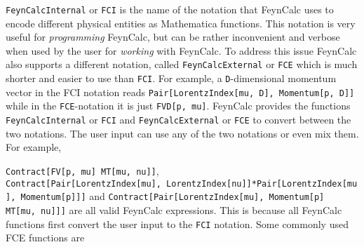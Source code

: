 \documentclass[../FeynCalcManual.tex]{subfiles}
\begin{document}
\texttt{FeynCalcInternal} or \texttt{FCI} is the name of the notation
that FeynCalc uses to encode different physical entities as Mathematica
functions. This notation is very useful for \emph{programming} FeynCalc,
but can be rather inconvenient and verbose when used by the user for
\emph{working} with FeynCalc. To address this issue FeynCalc also
supports a different notation, called \texttt{FeynCalcExternal} or
\texttt{FCE} which is much shorter and easier to use than \texttt{FCI}.
For example, a \texttt{D}-dimensional momentum vector in the FCI
notation reads
\texttt{Pair[\allowbreak{}LorentzIndex[\allowbreak{}mu,\ \allowbreak{}D],\ \allowbreak{}Momentum[\allowbreak{}p,\ \allowbreak{}D]]}
while in the \texttt{FCE}-notation it is just
\texttt{FVD[\allowbreak{}p,\ \allowbreak{}mu]}. FeynCalc provides the
functions \texttt{FeynCalcInternal} or \texttt{FCI} and
\texttt{FeynCalcExternal} or \texttt{FCE} to convert between the two
notations. The user input can use any of the two notations or even mix
them. For example,

\texttt{Contract[\allowbreak{}FV[\allowbreak{}p,\ \allowbreak{}mu] MT[\allowbreak{}mu,\ \allowbreak{}nu]]},
\texttt{Contract[\allowbreak{}Pair[\allowbreak{}LorentzIndex[\allowbreak{}mu],\ \allowbreak{}LorentzIndex[\allowbreak{}nu]]*Pair[\allowbreak{}LorentzIndex[\allowbreak{}mu],\ \allowbreak{}Momentum[\allowbreak{}p]]]}
and
\texttt{Contract[\allowbreak{}Pair[\allowbreak{}LorentzIndex[\allowbreak{}mu],\ \allowbreak{}Momentum[\allowbreak{}p] MT[\allowbreak{}mu,\ \allowbreak{}nu]]]}
are all valid FeynCalc expressions. This is because all FeynCalc
functions first convert the user input to the \texttt{FCI} notation.
Some commonly used FCE functions are
\end{document}
